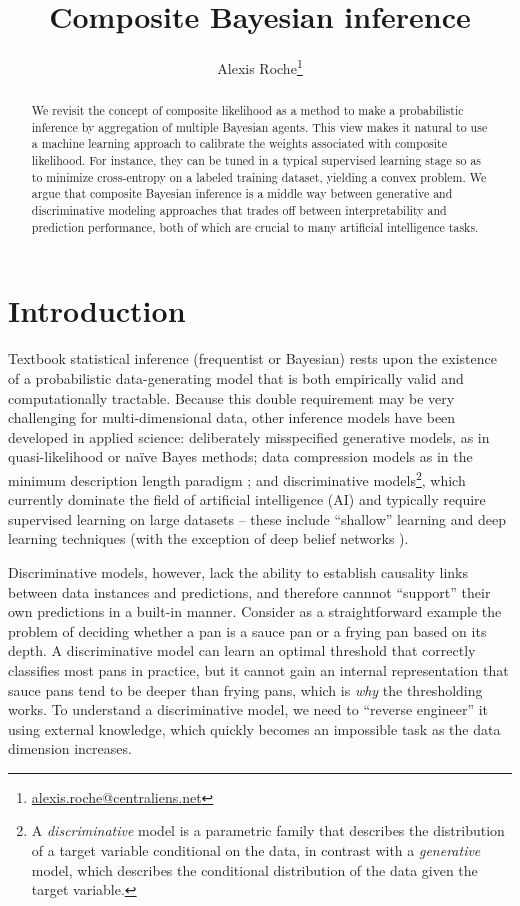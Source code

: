 \documentclass[english]{scrartcl}
\title{Composite Bayesian inference}
\date{}
\author{Alexis Roche\thanks{\url{alexis.roche@centraliens.net}}}
\begin{document}
\maketitle

\begin{abstract}
We revisit the concept of composite likelihood as a method to make a probabilistic inference by aggregation of multiple Bayesian agents. This view makes it natural to use a machine learning approach to calibrate the weights associated with composite likelihood. For instance, they can be tuned in a typical supervised learning stage so as to minimize cross-entropy on a labeled training dataset, yielding a convex problem. We argue that composite Bayesian inference is a middle way between generative and discriminative modeling approaches that trades off between interpretability and prediction performance, both of which are crucial to many artificial intelligence tasks.
\end{abstract}


\section{Introduction}
\label{sec:intro}

Textbook statistical inference (frequentist or Bayesian) rests upon the existence of a probabilistic data-generating model that is both empirically valid and computationally tractable. Because this double requirement may be very challenging for multi-dimensional data, other inference models have been developed in applied science: deliberately misspecified generative models, as in quasi-likelihood \cite{White-82,Walker-13} or na\"ive Bayes \cite{Ng-01} methods; data compression models as in the minimum description length paradigm \cite{Grunwald-07}; and discriminative models\footnote{A {\em discriminative} model is a parametric family that describes the distribution of a target variable conditional on the data, in contrast with a {\em generative} model, which describes the conditional distribution of the data given the target variable.}, which currently dominate the field of artificial intelligence (AI) and typically require supervised learning on large datasets -- these include ``shallow'' learning \cite{Ho-95,BergerA-96,Vapnik-00,Rasmussen-06} and deep learning \cite{Lecun-15,Goodfellow-16} techniques (with the exception of deep belief networks \cite{Hinton-06}).

Discriminative models, however, lack the ability to establish causality links between data instances and predictions, and therefore cannnot ``support'' their own predictions in a built-in manner. Consider as a straightforward example the problem of deciding whether a pan is a sauce pan or a frying pan based on its depth. A discriminative model can learn an optimal threshold that correctly classifies most pans in practice, but it cannot gain an internal representation that sauce pans tend to be deeper than frying pans, which is {\em why} the thresholding works. To understand a discriminative model, we need to ``reverse engineer'' it using external knowledge, which quickly becomes an impossible task as the data dimension increases.
\end{document}
